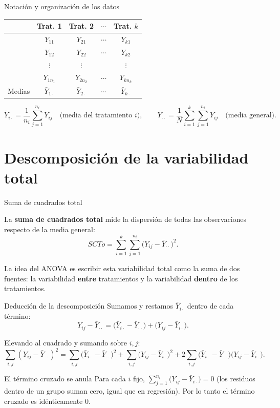 \documentclass[aspectratio=169,11pt]{beamer}
\begin{document}
\begin{frame}{Notación y organización de los datos}
\begin{table}[htbp]
\centering
\begin{tabular}{c|cccc}
\toprule
& Trat. 1 & Trat. 2 & $\cdots$ & Trat. $k$ \\
\midrule
& $Y_{11}$ & $Y_{21}$ & $\cdots$ & $Y_{k1}$ \\
& $Y_{12}$ & $Y_{22}$ & $\cdots$ & $Y_{k2}$ \\
& $\vdots$ & $\vdots$ & & $\vdots$ \\
& $Y_{1n_1}$ & $Y_{2n_2}$ & $\cdots$ & $Y_{kn_k}$ \\
\midrule
Medias & $\bar Y_{1\cdot}$ & $\bar Y_{2\cdot}$ & $\cdots$ & $\bar Y_{k\cdot}$ \\
\bottomrule
\end{tabular}
\end{table}

\[
\bar Y_{i\cdot} = \frac{1}{n_i}\sum_{j=1}^{n_i} Y_{ij} \quad \text{(media del tratamiento } i\text{)}, \qquad
\bar Y_{\cdot\cdot} = \frac{1}{N}\sum_{i=1}^k\sum_{j=1}^{n_i} Y_{ij} \quad \text{(media general).}
\]
\end{frame}

\section{Descomposición de la variabilidad total}

\begin{frame}{Suma de cuadrados total}
\begin{definition}
La \textbf{suma de cuadrados total} mide la dispersión de todas las observaciones respecto de la media general:
\[
SCTo = \sum_{i=1}^k \sum_{j=1}^{n_i} \big(Y_{ij} - \bar Y_{\cdot\cdot}\big)^2.
\]
\end{definition}

La idea del ANOVA es escribir esta variabilidad total como la suma de dos fuentes: la variabilidad \textbf{entre} tratamientos y la variabilidad \textbf{dentro} de los tratamientos.
\end{frame}

\begin{frame}{Deducción de la descomposición}
Sumamos y restamos $\bar Y_{i\cdot}$ dentro de cada término:
\[
Y_{ij}-\bar Y_{\cdot\cdot} = \big(\bar Y_{i\cdot}-\bar Y_{\cdot\cdot}\big) + \big(Y_{ij}-\bar Y_{i\cdot}\big).
\]

Elevando al cuadrado y sumando sobre $i,j$:
\[
\sum_{i,j}(Y_{ij}-\bar Y_{\cdot\cdot})^2 = \sum_{i,j}\big(\bar Y_{i\cdot}-\bar Y_{\cdot\cdot}\big)^2 + \sum_{i,j}\big(Y_{ij}-\bar Y_{i\cdot}\big)^2 + 2\sum_{i,j}\big(\bar Y_{i\cdot}-\bar Y_{\cdot\cdot}\big)\big(Y_{ij}-\bar Y_{i\cdot}\big).
\]

\begin{block}{El término cruzado se anula}
Para cada $i$ fijo, $\displaystyle\sum_{j=1}^{n_i}\big(Y_{ij}-\bar Y_{i\cdot}\big) = 0$ (los residuos dentro de un grupo suman cero, igual que en regresión). Por lo tanto el término cruzado es idénticamente $0$.
\end{block}
\end{frame}
\end{document}
